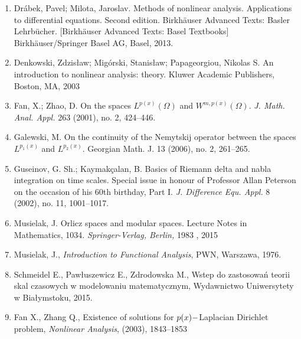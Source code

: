 \documentclass[12pt,a4paper,oneside,titlepage]{article}
\begin{document}
\begin{enumerate}
\item
\label{Drabek}
Drábek, Pavel; Milota, Jaroslav. Methods of nonlinear analysis. Applications to differential equations. Second edition. Birkhäuser Advanced Texts: Basler Lehrbücher. [Birkhäuser Advanced Texts: Basel Textbooks] Birkhäuser/Springer Basel AG, Basel, 2013.
\item
\label{Migorski}
Denkowski, Zdzisław; Migórski, Stanisław; Papageorgiou, Nikolas S. An introduction to nonlinear analysis: theory. Kluwer Academic Publishers, Boston, MA, 2003
\item
\label{oryginal}
Fan, X.; Zhao, D. On the spaces $L^{p(x)}(\Omega)$ and $W^{m,p(x)}(\Omega)$. \textit{J. Math. Anal. Appl.} 263 (2001), no. 2, 424--446.
\item
Galewski, M. On the continuity of the Nemytskij operator between the spaces $L^{p_1(x)}$ and $L^{p_2(x)}$. Georgian Math. J. 13 (2006), no. 2, 261--265.
\item
 Guseinov, G. Sh.; Kaymakçalan, B. Basics of Riemann delta and nabla integration on time scales. Special issue in honour of Professor Allan Peterson on the occasion of his 60th birthday, Part I. \textit{J. Difference Equ. Appl.} 8 (2002), no. 11, 1001--1017.
\item
\label{Musielak_modular}
 Musielak, J. Orlicz spaces and modular spaces. Lecture Notes in Mathematics, 1034. \textit{Springer-Verlag, Berlin,} 1983  , 2015 
\item 
\label{Musielak_analysis}
Musielak, J., \textit{Introduction to Functional Analysis}, PWN, Warszawa, 1976.
\item 
\label{Schmeidel}
Schmeidel E., Pawłuszewicz E., Zdrodowska M., Wstep do zastosowań teorii skal czasowych w modelowaniu matematycznym, Wydawnictwo Uniwersytety w Białymstoku, 2015.
 \item
 \label{Xian-Ling}
Fan X., Zhang Q., Existence of solutions for $p(x) \-- $Laplacian Dirichlet problem, \textit{Nonlinear Analysis}, (2003), 1843--1853




\end{enumerate}
\newpage

\tableofcontents
\end{document}
